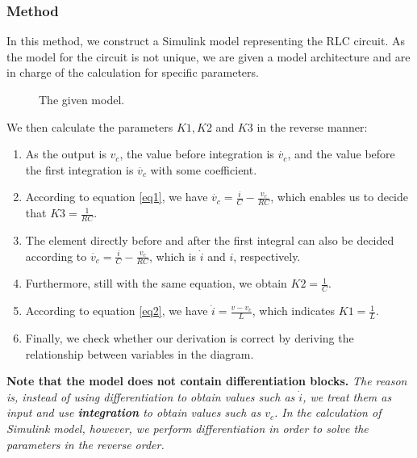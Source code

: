 \documentclass{article}
\begin{document}
  \subsubsection{Method}
  In this method, we construct a Simulink model representing the RLC circuit. As the model for the circuit is not unique, we are given a model architecture and are in charge of the calculation for specific parameters.\par
  \begin{figure}[H]
    \centering
    \noindent{}
    \caption{The given model.} \label{fig:md0}
  \end{figure}
  We then calculate the parameters $K1, K2$ and $K3$ in the reverse manner:
  \begin{enumerate}
    \item As the output is $v_c$, the value before integration is $\dot{v_c}$, and the value before the first integration is $\ddot{v_c}$ with some coefficient.
    \item According to equation \eqref{eq1}, we have $\dot{v_c} = \frac{i}{C} - \frac{v_c}{RC}$, which enables us to decide that $K3 = \frac{1}{RC}$.
    \item The element directly before and after the first integral can also be decided according to $\dot{v_c} = \frac{i}{C} - \frac{v_c}{RC}$, which is $\dot{i}$ and $i$, respectively.
    \item Furthermore, still with the same equation, we obtain $K2 = \frac{1}{C}$.
    \item According to equation \eqref{eq2}, we have $\dot{i} = \frac{v - v_c}{L}$, which indicates $K1 = \frac{1}{L}$.
    \item Finally, we check whether our derivation is correct by deriving the relationship between variables in the diagram.
  \end{enumerate}\par
  \textbf{Note that the model does not contain differentiation blocks.} \textit{The reason is, instead of using differentiation to obtain values such as $\dot{i}$, we treat them as input and use \textbf{integration} to obtain values such as $v_c$. In the calculation of Simulink model, however, we perform differentiation in order to solve the parameters in the reverse order.}\par
  
\end{document}
